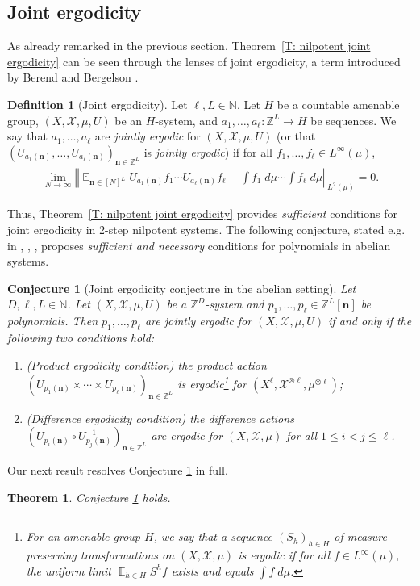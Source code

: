 \documentclass[11pt]{amsart}
\newtheorem{theorem}[lemma]{Theorem}
\newtheorem{conjecture}[lemma]{Conjecture}
\theoremstyle{definition}
\newtheorem{definition}[lemma]{Definition}
\DeclareMathOperator*{\E}{\mathbb{E}}
\newcommand{\N}{{\mathbb N}}
\newcommand{\Z}{{\mathbb Z}}
\newcommand{\CX}{{\mathcal X}}
\newcommand{\bn}{{\mathbf{n}}}
\newcommand{\norm}[1]{\left\Vert #1\right\Vert}
\newcommand{\inv}{^{-1}}
\newcommand{\1}{{\mathbf{1}}}
\begin{document}
\subsection{Joint ergodicity} 


As already remarked in the previous section, Theorem~\ref{T: nilpotent joint ergodicity} can be seen through the lenses of joint ergodicity, a term introduced by Berend and Bergelson \cite{BB84}.
\begin{definition}[Joint ergodicity]
    Let $\ell, L\in\N$. Let $H$ be a countable amenable group, $(X, \CX, \mu, U)$ be an $H$-system, and $a_1, \ldots, a_\ell: \Z^L\to H$ be sequences. We say that $a_1, \ldots, a_\ell$ are \textit{jointly ergodic} for $(X, \CX, \mu, U)$ (or that $(U_{a_1(\bn)}, \ldots, U_{a_\ell(\bn)})_{\bn\in\Z^L}$ is \textit{jointly ergodic}) if for all $f_1, \ldots, f_\ell\in L^\infty(\mu)$,
    \begin{align}\label{E: joint ergodicity}
        \lim_{N\to\infty}\norm{\E_{\bn\in[N]^L}U_{a_1(\bn)}f_1\cdots U_{a_\ell(\bn)}f_\ell - \int f_1\; d\mu\cdots \int f_\ell\;d\mu}_{L^2(\mu)} = 0.
    \end{align}
\end{definition}
Thus, Theorem~\ref{T: nilpotent joint ergodicity} provides \textit{sufficient} conditions for joint ergodicity in 2-step nilpotent systems. The following conjecture, stated e.g. in {\cite[Conjecture 1.3]{DFKS22}, \cite[Conjecture 1.5]{DKS22}, \cite[Problem~18]{Kuc26}}, proposes \textit{sufficient and necessary} conditions for polynomials in abelian systems.
\begin{conjecture}[Joint ergodicity conjecture in the abelian setting]\label{C: joint ergodicity conjecture}
    Let $D,\ell, L\in\N$. Let $(X, \CX, \mu, U)$ be a $\Z^D$-system and $p_1, \ldots, p_\ell\in\Z^L[\bn]$ be polynomials. Then $p_1, \ldots, p_\ell$ are jointly ergodic for $(X, \CX, \mu, U)$ if and only if the following two conditions hold:
    \begin{enumerate}
        \item (Product ergodicity condition) the product action $(U_{p_1(\bn)}\times \cdots\times U_{p_\ell(\bn)})_{\bn\in\Z^L}$ is ergodic\footnote{{For an amenable group $H$, we say that a sequence $(S_h)_{h\in H}$ of measure-preserving transformations on $(X, \CX, \mu)$ is \textit{ergodic} if for all $f\in L^\infty(\mu)$, the uniform limit $\E_{h\in H}S^h f$ exists and equals $\int f\; d\mu$.}} for $(X^\ell, \CX^{\otimes \ell}, \mu^{\otimes \ell})$;
        \item (Difference ergodicity condition) the difference actions $(U_{p_i(\bn)}\circ U\inv_{p_j(\bn)})_{\bn\in\Z^L}$ are ergodic for $(X, \CX, \mu)$ for all $1\leq i < j\leq \ell$.
    \end{enumerate}
\end{conjecture}
Our next result resolves Conjecture \ref{C: joint ergodicity conjecture} in full.
\begin{theorem}\label{T: joint ergodicity conjecture}
    Conjecture \ref{C: joint ergodicity conjecture} holds.
\end{theorem}
\end{document}
